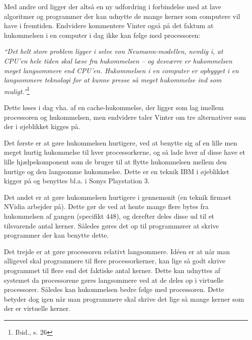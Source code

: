 \documentclass[10pt,a4paper]{article}
\newcommand{\citat}[2]{\begin{justify}\textit{``#1''}\hspace{0.1cm}\footnote{#2}\end{justify}}
\begin{document}
Med andre ord ligger der altså en ny udfordring i forbindelse med at lave algoritmer og programmer der kan udnytte de mange kerner som computere vil have i fremtiden. Endvidere kommentere Vinter også på det faktum at hukommelsen i en computer i dag ikke kan følge med processoren:
\citat{Det helt store problem ligger i selve von Neumann-modellen, nemlig i, at CPU’en hele tiden skal læse fra hukommelsen -- og desværre er hukommelsen
meget langsommere end CPU’en. Hukommelsen i en computer er opbygget i en langsommere teknologi for at kunne presse så meget hukommelse ind som muligt.}{Ibid., s. 26}

Dette løses i dag vha. af en cache-hukommelse, der ligger som lag imellem processoren og hukommelsen, men endvidere taler Vinter om tre alternativer som der i øjeblikket kigges på.

Det første er at gøre hukommelsen hurtigere, ved at benytte sig af en lille men meget hurtig hukommelse til hver processorkerne, og så lade hver af disse have et lille hjælpekomponent som de bruger til at flytte hukommelsen mellem den hurtige og den langsomme hukommelse. Dette er en teknik IBM i øjeblikket kigger på og benyttes bl.a. i Sonys Playstation 3.

Det andet er at gøre hukommelsen hurtigere i gennemsnit (en teknik firmaet NVidia arbejder på). Dette gør de ved at hente mange flere bytes fra hukommelsen af gangen (specifikt 448), og derefter deles disse ud til et tilsvarende antal kerner. Således gøres det op til programmører at skrive programmer der kan benytte dette.

Det trejde er at gøre processoren relativt langsommere. Idéen er at når man alligevel skal programmere til flere processorkerner, kan lige så godt skrive programmet til flere end det faktiske antal kerner. Dette kan udnyttes af systemet da processorene gøres langsommere ved at de deles op i virtuelle processorer. Således kan hukommelsen bedre følge med processoren. Dette betyder dog igen når man programmere skal skrive det lige så mange kerner som der er virtuelle kerner.
\end{document}
